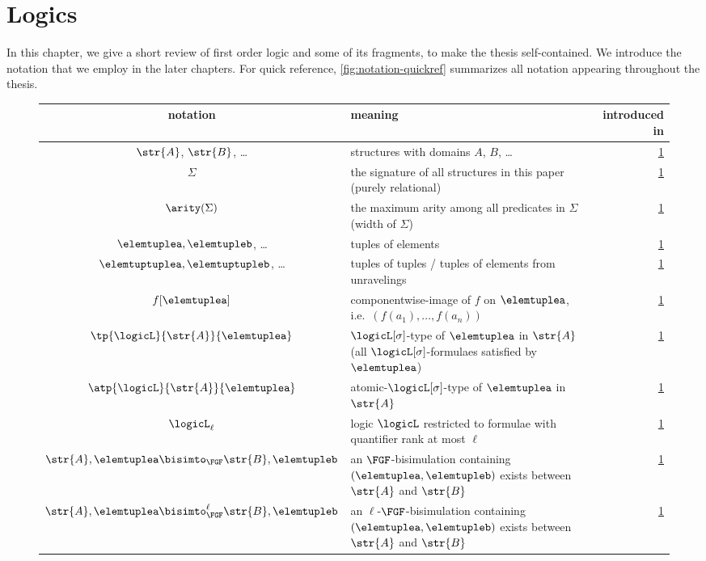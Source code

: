 \chapter{Logics}\label{chap:logics}

In this chapter, we give a short review of first order logic and some of its fragments, to make the thesis self-contained.
We introduce the notation that we employ in the later chapters.
For quick reference, \cref{fig:notation-quickref} summarizes all notation appearing throughout the thesis.
\begin{figure}
  \centering
  \bgroup
  \def\arraystretch{1.1}
  \begin{tabularx}{\textwidth}{c X r}
    notation & meaning & introduced in \\
    \hline
    $\str{A}$, $\str{B}$, \ldots & structures with domains $A$, $B$, \ldots & \cref{chap:logics} \\
    $\Sigma$ & the signature of all structures in this paper (purely relational) & \cref{chap:logics} \\
    $\arity(\Sigma)$ & the maximum arity among all predicates in $\Sigma$ (width of $\Sigma$) & \cref{chap:logics} \\
    $\elemtuplea, \elemtupleb$, \ldots & tuples of elements & \cref{chap:logics} \\
    $\elemtuptuplea, \elemtuptupleb$, \ldots & tuples of tuples / tuples of elements from unravelings & \cref{chap:logics} \\
    $f[\elemtuplea]$ & componentwise-image of $f$ on $\elemtuplea$, i.e.\ $(f(a_{1}), \ldots, f(a_{n}))$ & \cref{chap:logics} \\
    $\tp{\logicL}{\str{A}}{\elemtuplea}$ & $\logicL[\sigma]$-type of $\elemtuplea$ in $\str{A}$ (all $\logicL[\sigma]$-formulaes satisfied by $\elemtuplea$) & \cref{chap:logics} \\
    $\atp{\logicL}{\str{A}}{\elemtuplea}$ & atomic-$\logicL[\sigma]$-type of $\elemtuplea$ in $\str{A}$ & \cref{chap:logics} \\
    $\logicL_{\ell}$ & logic $\logicL$ restricted to formulae with quantifier rank at most $\ell$ & \cref{chap:logics} \\
    $\str{A}, \elemtuplea \bisimto_{\FGF} \str{B}, \elemtupleb$ & an $\FGF$-bisimulation containing $(\elemtuplea, \elemtupleb)$ exists between $\str{A}$ and $\str{B}$ & \cref{chap:logics} \\
    $\str{A}, \elemtuplea \bisimto_{\FGF}^{\ell} \str{B}, \elemtupleb$ & an $\ell$-$\FGF$-bisimulation containing $(\elemtuplea, \elemtupleb)$ exists between $\str{A}$ and $\str{B}$ & \cref{chap:logics} \\

\end{tabularx}
\end{figure}
